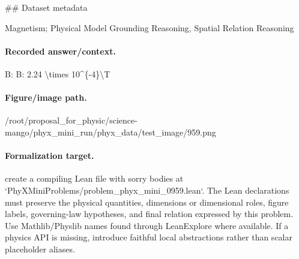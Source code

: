 \#\# Dataset metadata

Magnetism; Physical Model Grounding Reasoning, Spatial Relation Reasoning

\paragraph{Recorded answer/context.}
B: B: 2.24 \textbackslash{}times 10\textasciicircum{}\{-4\}\textbackslash{}T

\paragraph{Figure/image path.}
/root/proposal\_for\_physic/science-mango/phyx\_mini\_run/phyx\_data/test\_image/959.png

\paragraph{Formalization target.}
create a compiling Lean file with sorry bodies at `PhyXMiniProblems/problem\_phyx\_mini\_0959.lean`. The Lean declarations must preserve the physical quantities, dimensions or dimensional roles, figure labels, governing-law hypotheses, and final relation expressed by this problem.
Use Mathlib/Physlib names found through LeanExplore where available. If a physics API is missing, introduce faithful local abstractions rather than scalar placeholder aliases.

